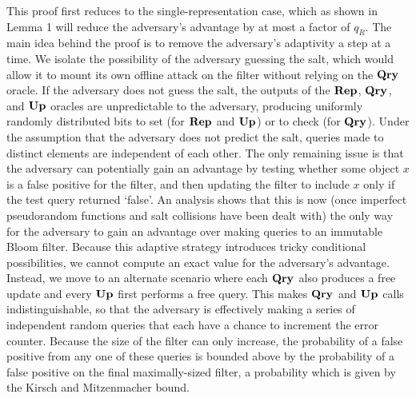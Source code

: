 This proof first reduces to the single-representation case, which as shown in Lemma 1 will reduce the adversary's advantage by at most a factor of $q_R$. The main idea behind the proof is to remove the adversary's adaptivity a step at a time. We isolate the possibility of the adversary guessing the salt, which would allow it to mount its own offline attack on the filter without relying on the $\mathbf{Qry}\hspace{0.5pt}$ oracle. If the adversary does not guess the salt, the outputs of the $\mathbf{Rep}\hspace{0.5pt}$, $\mathbf{Qry}\hspace{0.5pt}$, and $\mathbf{Up}\hspace{0.5pt}$ oracles are unpredictable to the adversary, producing uniformly randomly distributed bits to set (for $\mathbf{Rep}\hspace{0.5pt}$ and $\mathbf{Up}\hspace{0.5pt}$) or to check (for $\mathbf{Qry}\hspace{0.5pt}$). Under the assumption that the adversary does not predict the salt, queries made to distinct elements are independent of each other. The only remaining issue is that the adversary can potentially gain an advantage by testing whether some object $x$ is a false positive for the filter, and then updating the filter to include $x$ only if the test query returned `false'. An analysis shows that this is now (once imperfect pseudorandom functions and salt collisions have been dealt with) the only way for the adversary to gain an advantage over making queries to an immutable Bloom filter. Because this adaptive strategy introduces tricky conditional possibilities, we cannot compute an exact value for the adversary's advantage. Instead, we move to an alternate scenario where each $\mathbf{Qry}\hspace{0.5pt}$ also produces a free update and every $\mathbf{Up}\hspace{0.5pt}$ first performs a free query. This makes $\mathbf{Qry}\hspace{0.5pt}$ and $\mathbf{Up}\hspace{0.5pt}$ calls indistinguishable, so that the adversary is effectively making a series of independent random queries that each have a chance to increment the error counter. Because the size of the filter can only increase, the probability of a false positive from any one of these queries is bounded above by the probability of a false positive on the final maximally-sized filter, a probability which is given by the Kirsch and Mitzenmacher bound.

